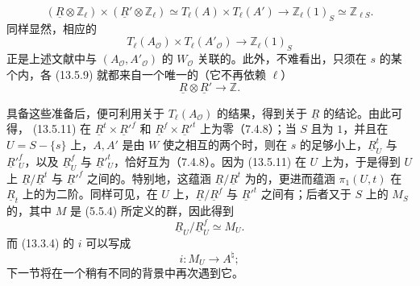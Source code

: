 \begin{equation}
 (\underline R\otimes\mathbb Z_\ell)\times
 (\underline R'\otimes\mathbb Z_\ell)
 \simeq T_\ell(A)\times T_\ell(A')
 \longrightarrow\mathbb Z_\ell(1)_S\simeq\mathbb Z_{\ell S}.
 \tag{13.5.9}
\end{equation}
同样显然，相应的
\begin{equation}
 T_\ell(A_{\mathcal O})\times T_\ell(A'_{\mathcal O})
 \longrightarrow\mathbb Z_\ell(1)_S
 \tag{13.5.10}
\end{equation}
正是上述文献中与 $(A_{\mathcal O},A'_{\mathcal O})$ 的 $W_{\mathcal O}$ 关联的。此外，不难看出，只须在 $s$ 的某个内，各 (13.5.9) 就都来自一个唯一的（它不再依赖 $\ell$）
\begin{equation}
 \underline R\otimes\underline R'\longrightarrow\mathbb Z.
 \tag{13.5.11}
\end{equation}

具备这些准备后，便可利用关于 $T_\ell(A_{\mathcal O})$ 的结果，得到关于 $\underline R$ 的结论。由此可得， (13.5.11) 在 $\underline R^t\times\underline R'^f$ 和 $\underline R^f\times\underline R'^t$ 上为零（7.4.8）；当 $S$ 且为 $1$，并且在 $U=S-\{s\}$ 上，$A,A'$ 是由 $W$ 使之相互的两个时，则在 $s$ 的足够小上，$\underline R^t_U$ 与 $\underline R'^f_U$，以及 $\underline R^f_U$ 与 $\underline R'^t_U$，恰好互为（7.4.8）。因为 (13.5.11) 在 $U$ 上为，于是得到 $U$ 上 $\underline R/\underline R^t$ 与 $\underline R'^f$ 之间的。特别地，这蕴涵 $\underline R/\underline R^t$ 为的，更进而蕴涵 $\pi_1(U,t)$ 在 $\underline R_t$ 上的为二阶。同样可见，在 $U$ 上，$\underline R/\underline R^f$ 与 $\underline R'^t$ 之间有；后者又于 $S$ 上的 $M_S$ 的，其中 $M$ 是 (5.5.4) 所定义的群，因此得到
\begin{equation}
 \underline R_U/\underline R^f_U\simeq M_U.
 \tag{13.5.12}
\end{equation}
而 (13.3.4) 的 $i$ 可以写成
\begin{equation}
 i:M_U\longrightarrow A^\natural;
 \tag{13.5.13}
\end{equation}
下一节将在一个稍有不同的背景中再次遇到它。

